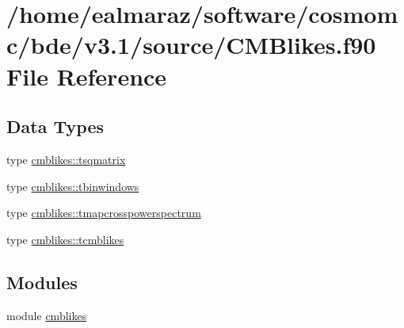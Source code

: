 \hypertarget{CMBlikes_8f90}{}\section{/home/ealmaraz/software/cosmomc/bde/v3.1/source/\+C\+M\+Blikes.f90 File Reference}
\label{CMBlikes_8f90}
\subsection*{Data Types}
\begin{DoxyCompactItemize}
\item 
type \mbox{\hyperlink{structcmblikes_1_1tsqmatrix}{cmblikes\+::tsqmatrix}}
\item 
type \mbox{\hyperlink{structcmblikes_1_1tbinwindows}{cmblikes\+::tbinwindows}}
\item 
type \mbox{\hyperlink{structcmblikes_1_1tmapcrosspowerspectrum}{cmblikes\+::tmapcrosspowerspectrum}}
\item 
type \mbox{\hyperlink{structcmblikes_1_1tcmblikes}{cmblikes\+::tcmblikes}}
\end{DoxyCompactItemize}
\subsection*{Modules}
\begin{DoxyCompactItemize}
\item 
module \mbox{\hyperlink{namespacecmblikes}{cmblikes}}
\end{DoxyCompactItemize}
